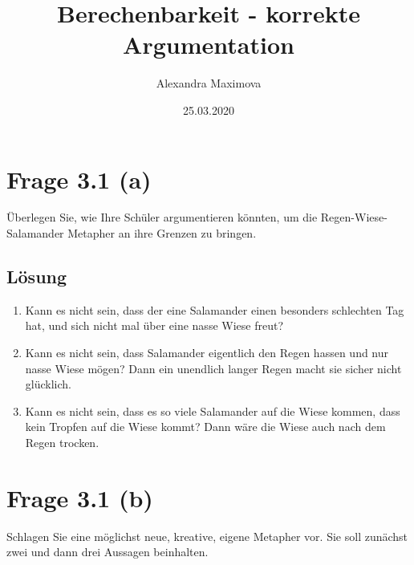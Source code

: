 \documentclass[
	12pt, %
	german, %
]{fphw}
\title{Berechenbarkeit - korrekte Argumentation} %
\author{Alexandra Maximova} %
\date{25.03.2020} %
\institute{ETH Zurich \\ Lehrdiplom Informatik} %
\begin{document}
\maketitle %


\section*{Frage 3.1 (a)}

\begin{problem}
	Überlegen Sie, wie Ihre Schüler argumentieren könnten, um die Regen-Wiese-Salamander Metapher an ihre Grenzen zu bringen.
\end{problem}


\subsection*{Lösung}

\begin{enumerate}
\item Kann es nicht sein, dass der eine Salamander einen besonders schlechten Tag hat, und sich nicht mal über eine nasse Wiese freut?
\item Kann es nicht sein, dass Salamander eigentlich den Regen hassen und nur nasse Wiese mögen? Dann ein unendlich langer Regen macht sie sicher nicht glücklich.
\item Kann es nicht sein, dass es so viele Salamander auf die Wiese kommen, dass kein Tropfen auf die Wiese kommt? Dann wäre die Wiese auch nach dem Regen trocken.
\end{enumerate}


\section*{Frage 3.1 (b)}

\begin{problem}
	Schlagen Sie eine möglichst neue, kreative, eigene Metapher vor. Sie soll zunächst zwei und dann drei Aussagen beinhalten.
\end{problem}
\end{document}
